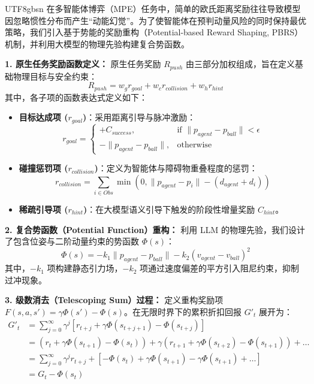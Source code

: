 \documentclass[11pt,a4paper]{article}
\begin{document}
\begin{CJK*}{UTF8}{gbsn}
在多智能体博弈（MPE）任务中，简单的欧氏距离奖励往往导致模型因忽略惯性分布而产生“动能幻觉”。为了使智能体在预判动量风险的同时保持最优策略，我们引入基于势能的奖励重构（Potential-based Reward Shaping, PBRS）机制，并利用大模型的物理先验构建复合势函数。

\begin{tcolorbox}[enhanced, colback=blue!5!white, colframe=SDUBlue, arc=2mm, title=\textbf{PBRS 理论推导、级数消去与策略不变性证明}]

\textbf{1. 原生任务奖励函数定义：}
原生任务奖励 $R_{push}$ 由三部分加权组成，旨在定义基础物理目标与安全约束：
\begin{equation}
R_{push} = w_g r_{goal} + w_c r_{collision} + w_h r_{hint}
\end{equation}
其中，各子项的函数表达式定义如下：
\begin{itemize}
    \item \textbf{目标达成项 ($r_{goal}$)}：采用距离引导与脉冲激励：
    \begin{equation}
    r_{goal} = 
    \begin{cases} 
    +C_{success}, & \text{if } \|p_{agent} - p_{ball}\| < \epsilon \\
    -\|p_{agent} - p_{ball}\|, & \text{otherwise}
    \end{cases}
    \end{equation}
    \item \textbf{碰撞惩罚项 ($r_{collision}$)}：定义为智能体与障碍物重叠程度的惩罚：
    \begin{equation}
    r_{collision} = \sum_{i \in Obs} \min(0, \|p_{agent} - p_i\| - (d_{agent} + d_i))
    \end{equation}
    \item \textbf{稀疏引导项 ($r_{hint}$)}：在大模型语义引导下触发的阶段性增量奖励 $C_{hint}$。
\end{itemize}

\textbf{2. 复合势函数（Potential Function）重构：}
利用 LLM 的物理先验，我们设计了包含位姿与二阶动量约束的势函数 $\Phi(s)$：
\begin{equation}
\Phi(s) = -k_1 \|p_{agent} - p_{ball}\| - k_2 (v_{agent} - v_{ball})^2
\end{equation}
其中，$-k_1$ 项构建静态引力场，$-k_2$ 项通过速度偏差的平方引入阻尼约束，抑制过冲现象。

\textbf{3. 级数消去（Telescoping Sum）过程：}
定义重构奖励项 $F(s, a, s') = \gamma \Phi(s') - \Phi(s)$。在无限时界下的累积折扣回报 $G'_t$ 展开为：
\begin{align}
G'_t &= \sum_{j=0}^{\infty} \gamma^j [r_{t+j} + \gamma \Phi(s_{t+j+1}) - \Phi(s_{t+j})] \nonumber \\
&= (r_t + \gamma \Phi(s_{t+1}) - \Phi(s_t)) + \gamma(r_{t+1} + \gamma \Phi(s_{t+2}) - \Phi(s_{t+1})) + \dots \nonumber \\
&= \sum_{j=0}^{\infty} \gamma^j r_{t+j} + \left[-\Phi(s_t) + \gamma \Phi(s_{t+1}) - \gamma \Phi(s_{t+1}) + \dots \right] \nonumber \\
&= G_t - \Phi(s_t)
\end{align}


\end{tcolorbox}
\end{CJK*}
\end{document}

